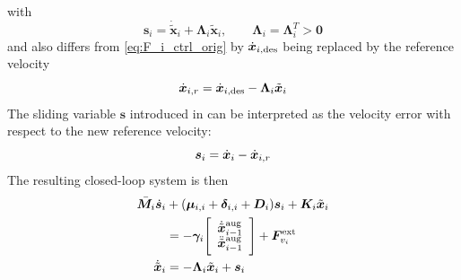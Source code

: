 \documentclass[../main.tex]{subfiles}
\begin{document}
with
\begin{equation}
    \label{eq:sliding_var}
    \bm{s}_i= \dot{\tilde{\bm{x}}}_i
    + \bm{\Lambda}_i \tilde{\bm{x}}_i, \quad \quad
    \bm{\Lambda}_i = \bm{\Lambda}_i^T >\bm{0}
\end{equation}
and also differs from \eqref{eq:F_i_ctrl_orig} by $\dot{\bm{x}}_{i, \rm des}$ being replaced by the reference velocity
\begin{equation}
    \setlength{\abovedisplayskip}{0pt}
    \setlength{\belowdisplayskip}{0pt}
    \dot{{\bm{x}}}_{i,r}=\dot{\bm{x}}_{i,\rm des} - \bm{\Lambda}_i \tilde{\bm{x}}_i
\end{equation}
The sliding variable $\bm{s}$ introduced in \cite{Slotine1987} can be interpreted as the velocity error with respect to the new reference velocity:
\begin{equation}
    \setlength{\abovedisplayskip}{0pt}
    \setlength{\belowdisplayskip}{0pt}
    \bm{s}_i=\dot{\bm{x}}_i - \dot{\bm{x}}_{i,r}
\end{equation}
The resulting closed-loop system is then
\begin{subequations}
    \label{eq:CL_sliding}
    \begin{align}
        \bar{\bm{M}}_i \dot{\bm{s}}_i
        &+ (\bm{\mu}_{i,i} + \bm{\delta}_{i,i} + \bm{D}_i)\bm{s}_i
        + \bm{K}_i \tilde{\bm{x}}_i\\
        &=
        - \bm{\gamma}_i\Bigg[
            \begin{array}{c}
                \dot{\tilde{\bm{x}}}_{i-1}^{\rm aug} \\
                \ddot{\tilde{\bm{x}}}_{i-1}^{\rm aug} \\
            \end{array}\Bigg]
        + \bm{F}_{v_i}^{\rm ext} \nonumber \\
        \dot{\tilde{\bm{x}}}_i &= - \bm{\Lambda}_i \tilde{\bm{x}}_i + \bm{s}_i
    \setlength{\abovedisplayskip}{0pt}
    \setlength{\belowdisplayskip}{0pt}
    \end{align}
\end{subequations}
\end{document}
